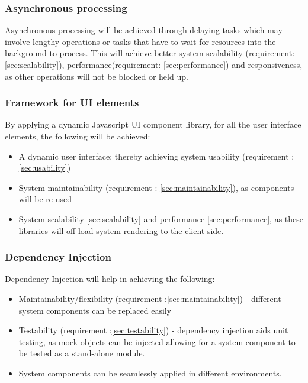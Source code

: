 \subsubsection{Asynchronous processing} \label{sec:asyncprocess}
Asynchronous processing will be achieved through delaying tasks which may involve lengthy operations or tasks that have to wait for resources into the background to process. This will achieve better system scalability (requirement: \ref{sec:scalability}), performance(requirement: \ref{sec:performance}) and responsiveness, as other operations will not be blocked or held up.


\subsubsection{Framework for UI elements} \label{sec:uiframework}
By applying a dynamic Javascript UI component library, for all the user interface elements, the following will be achieved:
\begin{itemize}
		\item A dynamic user interface; thereby achieving system usability (requirement :\ref{sec:usability})
		\item System maintainability (requirement : \ref{sec:maintainability}), as components will be re-used
		\item System scalability \ref{sec:scalability} and performance \ref{sec:performance}, as these libraries will off-load system rendering to the client-side.
\end{itemize}	

\subsubsection{Dependency Injection}  \label{sec:depinject}
Dependency Injection will help in achieving the following:
\begin{itemize}
		\item Maintainability/flexibility (requirement :\ref{sec:maintainability}) - different system components can be replaced easily 
		\item Testability (requirement :\ref{sec:testability}) - dependency injection aids unit testing, as mock objects can be injected allowing for a system component to be tested as a stand-alone module.
		\item System components can be seamlessly applied in different environments.	
\end{itemize}
